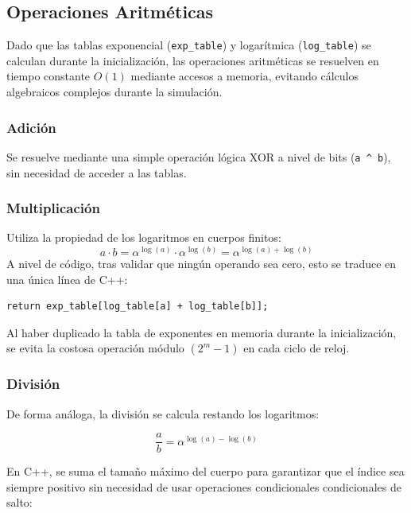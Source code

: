 \subsection{Operaciones Aritméticas}

Dado que las tablas exponencial (\texttt{exp\_table}) y logarítmica (\texttt{log\_table}) se calculan durante la inicialización, las operaciones aritméticas se resuelven en tiempo constante $O(1)$ mediante accesos a memoria, evitando cálculos algebraicos complejos durante la simulación.

\subsubsection{Adición} 
Se resuelve mediante una simple operación lógica XOR a nivel de bits (\texttt{a \textasciicircum{} b}), sin necesidad de acceder a las tablas.

\subsubsection{Multiplicación} 
Utiliza la propiedad de los logaritmos en cuerpos finitos:
\begin{equation}
a \cdot b = \alpha^{\log(a)} \cdot \alpha^{\log(b)} = \alpha^{\log(a) + \log(b)}
\end{equation}
A nivel de código, tras validar que ningún operando sea cero, esto se traduce en una única línea de C++:

\begin{lstlisting}[style=CodigoCPP, caption={Resolución en $O(1)$ de la multiplicación en el cuerpo finito mediante acceso a tablas precalculadas.}, label={lst:gf_multiplicacion}]
return exp_table[log_table[a] + log_table[b]];
\end{lstlisting}
Al haber duplicado la tabla de exponentes en memoria durante la inicialización, se evita la costosa operación módulo $(2^m - 1)$ en cada ciclo de reloj.

\subsubsection{División} 
De forma análoga, la división se calcula restando los logaritmos:

\begin{equation}
\frac{a}{b} = \alpha^{\log(a) - \log(b)}
\end{equation}

En C++, se suma el tamaño máximo del cuerpo para garantizar que el índice sea siempre positivo sin necesidad de usar operaciones condicionales condicionales de salto:


